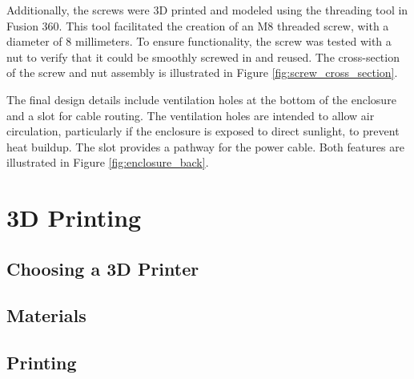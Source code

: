 Additionally, the screws were 3D printed and modeled using the threading tool in Fusion 360. This 
tool facilitated the creation of an M8 threaded screw, with a diameter of 8 millimeters. To ensure 
functionality, the screw was tested with a nut to verify that it could be smoothly screwed in and 
reused. The cross-section of the screw and nut assembly is illustrated in Figure 
\ref{fig:screw_cross_section}.

The final design details include ventilation holes at the bottom of the enclosure and a slot for 
cable routing. The ventilation holes are intended to allow air circulation, particularly if the 
enclosure is exposed to direct sunlight, to prevent heat buildup. The slot provides a pathway for 
the power cable. Both features are illustrated in Figure \ref{fig:enclosure_back}.


\section{3D Printing}

\subsection{Choosing a 3D Printer}

\subsection{Materials}

\subsection{Printing}
